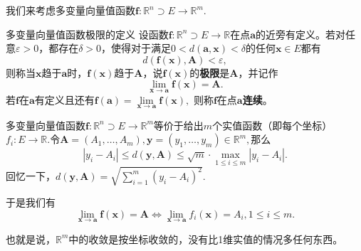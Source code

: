 \begin{frame}

我们来考虑多变量向量值函数$\mathbf{f}:\mathbb{R}^n \supset E \to \mathbb{R}^m.$

\pause

\begin{block}{多变量向量值函数极限的定义}
设函数$\mathbf{f}: \mathbb{R}^n \supset E \to \mathbb{R}$在点$\mathbf{a}$的近旁有定义。若对任意$\varepsilon > 0$，都存在$\delta > 0$，使得对于满足$0 < d(\mathbf{a}, \mathbf{x}) < \delta$的任何$\mathbf{x}\in E$都有
\[d(\mathbf{f}(\mathbf{x}), \mathbf{A}) < \varepsilon,\]
则称当$\mathbf{x}$趋于$\mathbf{a}$时，$\mathbf{f}(\mathbf{x})$趋于$\mathbf{A}$，说$\mathbf{f}(\mathbf{x})$的{\bfseries 极限}是$\mathbf{A}$，并记作
\[\lim\limits_{\mathbf{x}\to \mathbf{a}}\mathbf{f}(\mathbf{x}) = \mathbf{A}.\]
若$\mathbf{f}$在$\mathbf{a}$有定义且还有$\mathbf{f}(\mathbf{a}) = \lim\limits_{\mathbf{x} \to \mathbf{a}} \mathbf{f}(\mathbf{x}),$ 则称$\mathbf{f}$在点$\mathbf{a}${\bfseries 连续}。
\end{block}

\end{frame}


\begin{frame}

多变量向量值函数$\mathbf{f}:\mathbb{R}^n \supset E \to \mathbb{R}^m$等价于给出$m$个实值函数（即每个坐标）$f_i: E \to \mathbb{R}.$令$\mathbf{A} = (A_1,\ldots,A_m), \mathbf{y} = (y_1,\ldots,y_m) \in \mathbb{R}^m,$那么
\[|y_i - A_i| \leqslant d(\mathbf{y}, \mathbf{A}) \leqslant \sqrt{m}\cdot \max\limits_{1\leqslant i \leqslant m} |y_i - A_i|.\]
回忆一下，\(\displaystyle d(\mathbf{y}, \mathbf{A}) = \sqrt{\sum\limits_{i=1}^m (y_i - A_i)^2}.\)

\pause

于是我们有
\[\lim\limits_{\mathbf{x}\to\mathbf{a}} \mathbf{f}(\mathbf{x}) = \mathbf{A} \Longleftrightarrow \lim\limits_{\mathbf{x}\to\mathbf{a}} f_i(\mathbf{x}) = A_i, 1\leqslant i \leqslant m.\]

\pause

也就是说，$\mathbb{R}^m$中的收敛是按坐标收敛的，没有比1维实值的情况多任何东西。

\end{frame}



